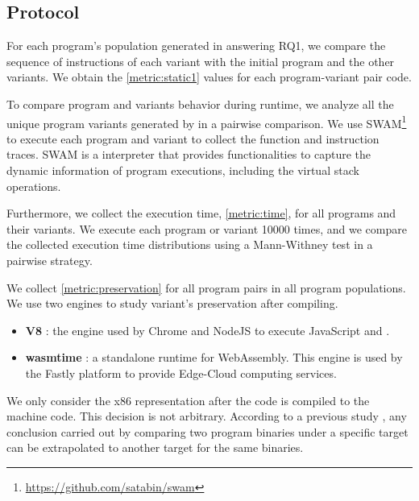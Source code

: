 \subsection{Protocol}

For each program's population generated in answering RQ1, we compare the sequence of instructions of each variant with the initial program and the other variants. We obtain the \autoref{metric:static1} values for each program-variant \wasm pair code. 

To compare program and variants behavior during runtime, we analyze all the unique program variants generated by \tool in a pairwise comparison. 
We use SWAM\footnote{\url{https://github.com/satabin/swam}} to execute each program and variant to collect the function and instruction traces. SWAM is a \wasm interpreter that provides functionalities to capture the dynamic information of \wasm program executions, including the virtual stack operations. 

Furthermore, we collect the execution time, \autoref{metric:time}, for all programs and their variants. We execute each program or variant 10000 times, and we compare the collected execution time distributions using a Mann-Withney test \citationneeded in a pairwise strategy.

We collect \autoref{metric:preservation} for all program pairs in all program populations. We use two \wasm engines to study variant's preservation after compiling.

\begin{itemize}
    \item \textbf{V8} \citationneeded: the engine used by Chrome and NodeJS to execute JavaScript and \wasm. 
    \item \textbf{wasmtime} \citationneeded: a standalone runtime for WebAssembly. This engine is used by the Fastly platform to provide Edge-Cloud computing services. 
\end{itemize}

We only consider the x86 representation after the \wasm code is compiled to the machine code. 
This decision is not arbitrary. According to a previous study \citationneeded, any conclusion carried out by comparing two program binaries under a specific target can be extrapolated to another target for the same binaries.



